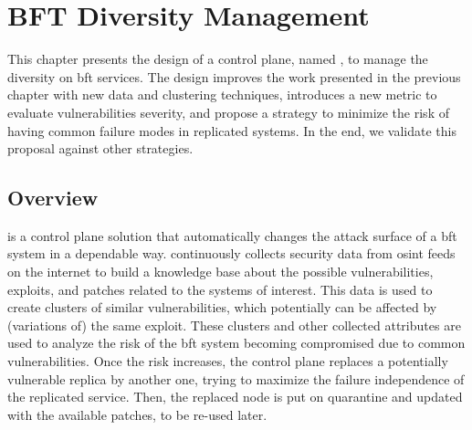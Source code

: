 \chapter{BFT Diversity Management}
\label{chap:lazarus_design}

This chapter presents the design of a control plane, named \system, to manage the diversity on \gls{bft} services.
The design improves the work presented in the previous chapter with new data and clustering techniques, introduces a new metric to evaluate vulnerabilities severity, and propose a strategy to minimize the risk of having common failure modes in replicated systems.
In the end, we validate this proposal against other strategies.


\section{Overview}
\system is a control plane solution that automatically changes the attack surface of a \gls{bft} system in a dependable way.
\system continuously collects security data from \gls{osint} feeds on the internet to build a knowledge base about the possible vulnerabilities, exploits, and patches related to the systems of interest.
This data is used to create clusters of similar vulnerabilities, which potentially can be affected by (variations of) the same exploit.
These clusters and other collected attributes are used to analyze the risk of the \gls{bft} system becoming compromised due to common vulnerabilities.
Once the risk increases, the control plane replaces a potentially vulnerable replica by another one, trying to maximize the failure independence of the replicated service.
Then, the replaced node is put on quarantine and updated with the available patches, to be re-used later.





